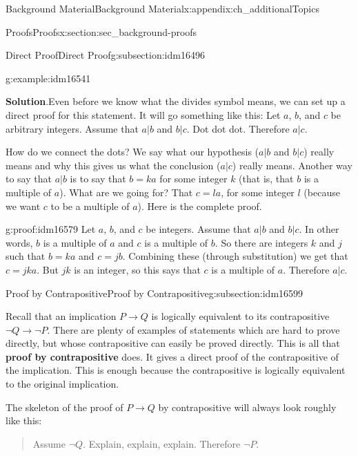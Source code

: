 \documentclass[oneside,10pt,]{book}
\newcommand{\terminology}[1]{\textbf{#1}}
\numberwithin{equation}{chapter}
\def\imp{\rightarrow}
\begin{document}
\begin{appendixptx}{Background Material}{}{Background Material}{}{}{x:appendix:ch_additionalTopics}
\begin{sectionptx}{Proofs}{}{Proofs}{}{}{x:section:sec_background-proofs}
\begin{subsectionptx}{Direct Proof}{}{Direct Proof}{}{}{g:subsection:idm16496}
\begin{example}{}{g:example:idm16541}
\par\smallskip%
\noindent\textbf{Solution}.\hypertarget{g:solution:idm16558}{}\quad{}Even before we know what the divides symbol means, we can set up a direct proof for this statement. It will go something like this: Let \(a\), \(b\), and \(c\) be arbitrary integers. Assume that \(a|b\) and \(b|c\). Dot dot dot. Therefore \(a|c\).%
\par
How do we connect the dots? We say what our hypothesis (\(a|b\) and \(b|c\)) really means and why this gives us what the conclusion (\(a|c\)) really means. Another way to say that \(a|b\) is to say that \(b = ka\) for some integer \(k\) (that is, that \(b\) is a multiple of \(a\)). What are we going for? That \(c = la\), for some integer \(l\) (because we want \(c\) to be a multiple of \(a\)). Here is the complete proof.%
\begin{proofptx}{}{g:proof:idm16579}
Let \(a\), \(b\), and \(c\) be integers. Assume that \(a|b\) and \(b|c\). In other words, \(b\) is a multiple of \(a\) and \(c\) is a multiple of \(b\). So there are integers \(k\) and \(j\) such that \(b = ka\) and \(c = jb\). Combining these (through substitution) we get that \(c = jka\). But \(jk\) is an integer, so this says that \(c\) is a multiple of \(a\). Therefore \(a|c\).%
\end{proofptx}
\end{example}
\end{subsectionptx}
%
%
\typeout{************************************************}
\typeout{************************************************}
%
\begin{subsectionptx}{Proof by Contrapositive}{}{Proof by Contrapositive}{}{}{g:subsection:idm16599}
%
\par
Recall that an implication \(P \imp Q\) is logically equivalent to its contrapositive \(\neg Q \imp \neg P\). There are plenty of examples of statements which are hard to prove directly, but whose contrapositive can easily be proved directly. This is all that \terminology{proof by contrapositive} does. It gives a direct proof of the contrapositive of the implication. This is enough because the contrapositive is logically equivalent to the original implication.%
\par
The skeleton of the proof of \(P \imp Q\) by contrapositive will always look roughly like this:%
\begin{quote}%
Assume \(\neg Q\). Explain, explain, \textellipsis{} explain. Therefore \(\neg P\).%

\end{quote}
\end{subsectionptx}
\end{sectionptx}
\end{appendixptx}
\end{document}

